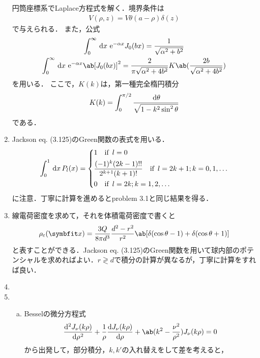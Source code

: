 \begin{enumerate}[label=\fbox{\textbf{\thesection.\arabic*}}]
    円筒座標系でLaplace方程式を解く．境界条件は
    \begin{gather}
      V(\rho, z) = V \theta(a - \rho)\delta(z)
    \end{gather}
    で与えられる．
    また，公式
    \begin{gather}
      \int_0^\infty \dl{x}\, \e^{-\alpha x} J_0(bx)  = \frac{1}{\sqrt{\alpha^2 + b^2}}\\
      \int_0^\infty \dl{x}\, \e^{-\alpha x} \ab[J_0(bx)]^2 = \frac{2}{\pi \sqrt{\alpha^2 + 4b^2}}K\ab(\frac{2b}{\sqrt{\alpha^2 + 4b^2}})
    \end{gather}
    を用いる．
    ここで，$K(k)$は，第一種完全楕円積分
    \begin{gather}
      K(k) = \int_0^{\pi/2} \frac{\dl{\theta}}{\sqrt{1-k^2\sin^2\theta}}
    \end{gather}
    である．
  \item %
    Jackson eq. (3.125)のGreen関数の表式を用いる．
    \begin{gather}
      \int_0^1 \dl{x} \, P_l(x) = 
      \begin{dcases}
        1 \qqtext{if} l = 0\\
        \frac{(-1)^k(2k-1)!!}{2^{k+1}(k+1)!} \qqtext{if} l = 2k+1; k = 0, 1, \ldots\\
        0 \qqtext{if} l = 2k; k = 1, 2, \ldots
      \end{dcases}
    \end{gather}
    に注意．丁寧に計算を進めるとproblem 3.1と同じ結果を得る．
  \item %
    線電荷密度を求めて，それを体積電荷密度で書くと
    \begin{gather}
      \rho_\mr{c} (\bs{x}) = \frac{3Q}{8\pi d^3} \frac{d^2 - r^2}{r^2} \ab[\delta(\cos\theta - 1) + \delta(\cos\theta + 1)]
    \end{gather}
    と表すことができる．Jackson eq. (3.125)のGreen関数を用いて球内部のポテンシャルを求めればよい．$r \gtrless d$で積分の計算が異なるが，丁寧に計算をすれば良い．
  \item %
  \item %
    \begin{enumerate}[(a)]
      \item
        Besselの微分方程式
        \begin{gather}
          \diff[2]{J_\nu(k\rho)}{\rho} + \frac{1}{\rho} \diff{J_\nu(k\rho)}{\rho} + \ab(k^2 - \frac{\nu^2}{\rho^2})J_\nu(k\rho)  = 0
        \end{gather}
        から出発して，部分積分，$k, k'$の入れ替えをして差を考えると，

\end{enumerate}
\end{enumerate}
